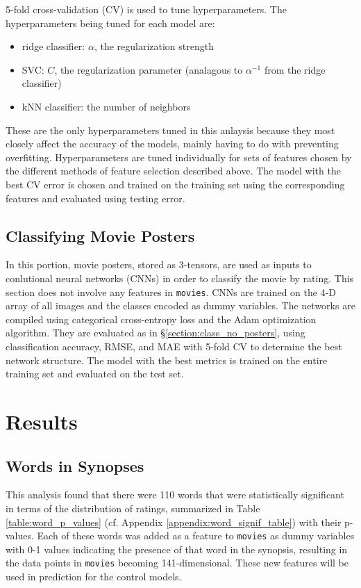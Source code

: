 \documentclass[12pt, oneside]{article}   	%
\begin{document}
5-fold cross-validation (CV) is used to tune hyperparameters. The hyperparameters being tuned for each model are:
\begin{itemize}
\item ridge classifier: $\alpha$, the regularization strength
\item SVC: $C$, the regularization parameter (analagous to $\alpha^{-1}$ from the ridge classifier)
\item kNN classifier: the number of neighbors
\end{itemize}
These are the only hyperparameters tuned in this anlaysis because they most closely affect the accuracy of the models, mainly having to do with preventing overfitting. Hyperparameters are tuned individually for sets of features chosen by the different methods of feature selection described above. The model with the best CV error is chosen and trained on the training set using the corresponding features and evaluated using testing error.

\subsection{Classifying Movie Posters}
\label{section:class_posters}

In this portion, movie posters, stored as 3-tensors, are used as inputs to conlutional neural networks (CNNs) in order to classify the movie by rating. This section does not involve any features in \texttt{movies}. CNNs are trained on the 4-D array of all images and the classes encoded as dummy variables. The networks are compiled using categorical cross-entropy loss and the Adam optimization algorithm. They are evaluated as in \S \ref{section:class_no_posters}, using classification accuracy, RMSE, and MAE with 5-fold CV to determine the best network structure. The model with the best metrics is trained on the entire training set and evaluated on the test set.

\section{Results}

\subsection{Words in Synopses}
\label{section:words_results}

This analysis found that there were 110 words that were statistically significant in terms of the distribution of ratings, summarized in Table \ref{table:word_p_values} (cf. Appendix \ref{appendix:word_signif_table}) with their p-values. Each of these words was added as a feature to \texttt{movies} as dummy variables with 0-1 values indicating the presence of that word in the synopsis, resulting in the data points in \texttt{movies} becoming 141-dimensional. These new features will be used in prediction for the control models.
\end{document}
